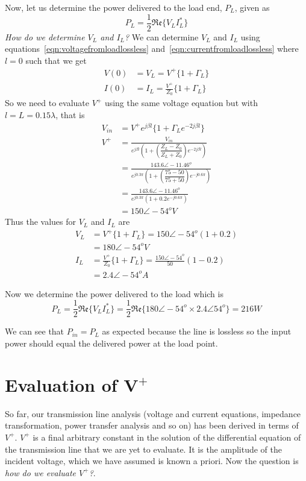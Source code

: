 \begin{exmp}
Now, let us determine the power delivered to the load end, $P_L$, given as
\begin{dmath*}
P_L = \frac{1}{2}\mathfrak{Re}\lbrace V_L I_L^\ast\rbrace
\end{dmath*}
\emph{How do we determine $V_L$ and $I_L$?} We can determine $V_L$ and $I_L$ using equations~\eqref{eqn:voltagefromloadlossless} and~\eqref{eqn:currentfromloadlossless} where $l = 0$ such that we get
\begin{align*}
V(0) &= V_L = V^+\lbrace1 + \Gamma_L\rbrace\\
I(0) &= I_L = \frac{V^+}{Z_0}\lbrace1 + \Gamma_L\rbrace
\end{align*}
So we need to evaluate $V^+$ using the same voltage equation but with $l = L = 0.15\lambda$, that is
\begin{align*}
V_{in} &= V^+e^{j\beta l}\lbrace1 + \Gamma_Le^{-2j\beta l}\rbrace\\
V^+ &= \frac{V_{in}}{e^{j\beta l}\left(1+\left(\dfrac{Z_L - Z_0}{Z_L + Z_0}\right)e^{-2j\beta l}\right)}\\
&=\frac{143.6\angle-11.46^o}{e^{j0.3\pi}\left(1 +\left(\dfrac{75 - 50}{75 + 50}\right)e^{-j0.6\pi}\right)}\\
&= \frac{143.6\angle-11.46^o}{e^{j0.3\pi}\left( 1+0.2e^{-j0.6\pi}\right)}\\
&= 150\angle-54^oV
\end{align*}
Thus the values for $V_L$ and $I_L$ are
\begin{align*}
V_L &= V^+\lbrace1 + \Gamma_L\rbrace = 150\angle-54^o(1 + 0.2)\\
&= 180\angle-54^o V\\
I_L &= \frac{V^+}{Z_0}\lbrace1 + \Gamma_L\rbrace = \frac{150\angle-54^o}{50}(1 - 0.2)\\
&= 2.4\angle-54^oA
\end{align*}

Now we determine the power delivered to the load which is
\begin{dmath*}
P_L = \frac{1}{2}\mathfrak{Re}\lbrace V_L I_L^\ast\rbrace
= \frac{1}{2}\mathfrak{Re}\lbrace 180\angle-54^o\times 2.4\angle54^o\rbrace
= 216W
\end{dmath*}

We can see that $P_{in} = P_L$ as expected because the line is lossless so the input power should equal the delivered power at the load point.
\end{exmp}

\section{Evaluation of $\mathbf{V^{+}}$}\label{sec:evalvplus}
So far, our transmission line analysis (voltage and current equations, impedance transformation, power transfer analysis and so on) has been derived in terms of $V^+$. $V^+$ is a final arbitrary constant in the solution of the differential equation of the transmission line that we are yet to evaluate. It is the amplitude of the incident voltage, which we have assumed is known a priori. Now the question is \emph{how do we evaluate $V^{+}$?}.

